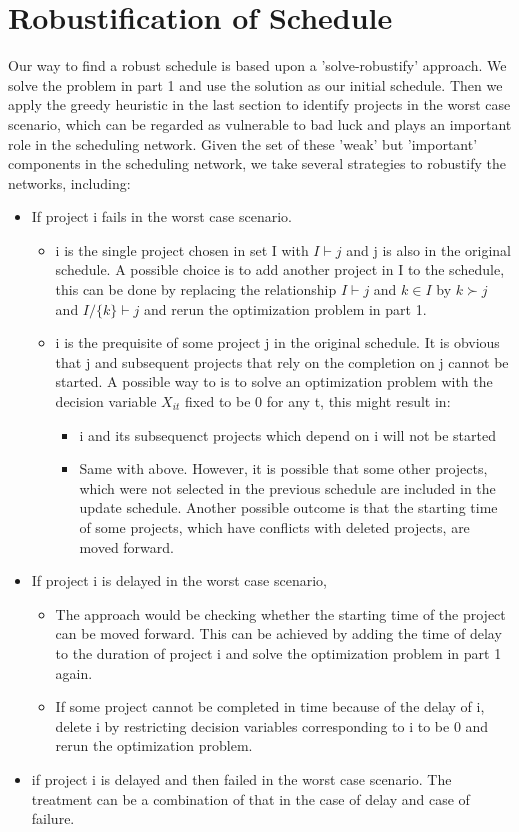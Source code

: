 \documentclass[final,3p,times]{elsarticle}
\begin{document}
\section{Robustification of Schedule}
Our way to find a robust schedule is based upon a 'solve-robustify' approach. We solve the problem in part 1 and use the solution as our initial schedule. Then we apply the greedy heuristic in the last section to identify projects in the worst case scenario, which can be regarded as vulnerable to bad luck and plays an important role in the scheduling network. Given the set of these 'weak'  but 'important' components in the scheduling network, we take several strategies to robustify the networks, including:
\begin{itemize}
\item If project i fails in the worst case scenario.
\begin{itemize}
\item i is the single project chosen in set I with $I\vdash j$ and j is also in the original schedule. A possible choice is to add another project in I to the schedule, this can be done by replacing the relationship $I \vdash j$ and $k \in I$ by $k \succ j$ and $I/\{k\} \vdash j$ and rerun the optimization problem in part 1. 
\item i is the prequisite of some project j in the original schedule. It is obvious that j and subsequent projects that rely on the completion on j cannot be started. A possible way to is to solve an optimization problem with the decision variable $X_{it}$ fixed to be 0 for any t, this might result in:
\begin{itemize}
\item i and its subsequenct projects which depend on i will not be started
\item Same with above. However, it is possible that some other projects, which were not selected in the previous schedule are included in the update schedule.  Another possible outcome is that the starting time of some projects, which have conflicts with deleted projects, are moved forward. 
\end{itemize}
\end{itemize}
\item If project i is delayed in the worst case scenario, 
\begin{itemize}
\item The approach would be checking whether the starting time of the project can be moved forward. This can be achieved by adding the time of delay to the duration of project i and solve the optimization problem in part 1 again.
\item If some project cannot be completed in time because of the delay of i, delete i by restricting decision variables corresponding to i to be 0 and rerun the optimization problem.
\end{itemize}
\item if project i is delayed and then failed in the worst case scenario. The treatment can be a combination of that in the case of delay and case of failure.
\end{itemize}
\end{document}
